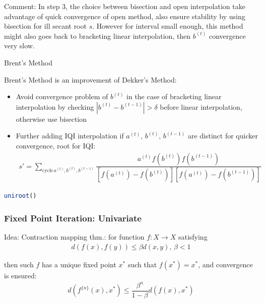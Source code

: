    Comment: In step 3, the choice between bisection and open interpolation take advantage of quick convergence of open method, also ensure stability by using bisection for ill secant root $ s $. However for interval small enough, this method might also goes back to bracketing linear interpolation, then $ b^{(t)} $ convergence very slow.
    

\begin{point}
    \hypertarget{Brent}{Brent's Method}
\end{point}

    Brent's Method is an improvement of Dekker's Method: 
\begin{itemize}[topsep=2pt,itemsep=0pt]
    \item Avoid convergence problem of $ b^{(t)} $ in the case of bracketing linear interpolation by checking $ |b^{(t)}-b^{(t-1)}|>\delta  $ before linear interpolation, otherwise use bisection
    \item Further adding IQI interpolation if $ a^{(t)},\,b^{(t)},\,b^{(t-1)} $ are distinct for quicker convergence, root for IQI:
    \begin{align}
        s'=\sum_{\mathrm{cycle}\,a^{(t)},b^{(t)},b^{(t-1)}}\dfrac{a^{(t)}f(b^{(t)})f(b^{(t-1)})}{\left[f(a^{(t)})-f(b^{(t)})\right]\left[f(a^{(t)})-f(b^{(t-1)})\right]}
    \end{align}

\end{itemize}

\begin{rcode}
\begin{lstlisting}[language=R]
uniroot()
\end{lstlisting}
\end{rcode}




\subsubsection{Fixed Point Iteration: Univariate}
\hypertarget{FixedPoint}{}
    Idea: Contraction mapping thm.: for function $ f:X\to X $ satisfying
    \begin{align}
        d(f(x),f(y))\leq \beta d(x,y),\, \beta <1 
    \end{align}
    
    then such $ f $ has a unique fixed point $ x^* $ such that $ f(x^*)=x^* $, and convergence is ensured:
    \begin{align}
        d(f^{\{n\}}(x),x^*)\leq \dfrac{\beta ^n}{1-\beta }d(f(x),x^*) 
    \end{align}
    

